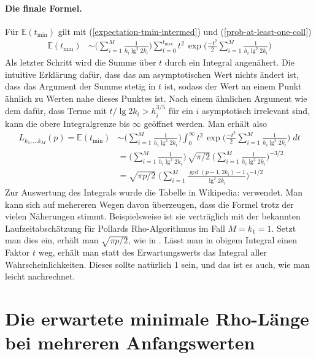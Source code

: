 \documentclass[a4paper, 10pt, ngerman]{article}
\newcommand{\E}{\mathbb{E}}
\begin{document}
\paragraph*{Die finale Formel.} \space \space Für $\E(t_{\min})$ gilt mit (\ref{expectation-tmin-intermed}) und (\ref{prob-at-least-one-coll})
\begin{align*}
    \E(t_{\min})
     & \sim \Bigg ( \sum_{i = 1}^M \frac 1 {h_i \lg^2 2k_i} \Bigg ) \sum_{t = 0}^{t_{\max}} t^2 \, \exp \Bigg ( \frac {-t^2} 2 \sum_{i = 1}^M \frac 1 {h_i \lg^2 2k_i} \Bigg )
\end{align*}
Als letzter Schritt wird die Summe über $t$ durch ein Integral angenähert. Die intuitive Erklärung dafür, dass das am asymptotischen Wert nichts ändert ist, dass das Argument der Summe stetig in $t$ ist, sodass der Wert an einem Punkt ähnlich zu Werten nahe dieses Punktes ist. Nach einem ähnlichen Argument wie dem dafür, dass Terme mit $t/\lg 2k_i > h_i^{3/5}$ für ein $i$ asymptotisch irrelevant sind, kann die obere Integralgrenze bis $\infty$ geöffnet werden. Man erhält also
\begin{align}
    L_{k_1, \dots k_M}(p) = \E(t_{\min})
     & \sim \Bigg ( \sum_{i = 1}^M \frac 1 {h_i \lg^2 2k_i} \Bigg ) \int_{0}^{\infty} t^2 \, \exp \Bigg ( \frac {-t^2} 2 \sum_{i = 1}^M \frac 1 {h_i \lg^2 2k_i} \Bigg ) \; dt \nonumber \\
     & = \Bigg (\sum_{i = 1}^M \frac 1 {h_i \lg^2 2k_i} \Bigg ) \, \sqrt {\pi / 2}  \ \Bigg ( \sum_{i = 1}^M \frac 1 {h_i \lg^2 2k_i} \Bigg )^{-3/2} \nonumber                           \\
     & = \sqrt{\pi p / 2} \; \Bigg ( \sum_{i = 1}^M \frac {\gcd(p - 1, 2k_i) - 1} {\lg^2 2k_i} \Bigg )^{-1/2}
    \label{expectation-tmin}
\end{align}
Zur Auswertung des Integrals wurde die Tabelle in Wikipedia: \cite{gint} verwendet. Man kann sich auf mehereren Wegen davon überzeugen, dass die Formel trotz der vielen Näherungen stimmt. Beispielsweise ist sie verträglich mit der bekannten Laufzeitabschätzung für Pollards Rho-Algorithmus im Fall $M = k_1 = 1$. Setzt man dies ein, erhält man $\sqrt{\pi p / 2}$, wie in \cite{pol75}. Lässt man in obigem Integral einen Faktor $t$ weg, erhält man statt des Erwartungswerts das Integral aller Wahrscheinlichkeiten. Dieses sollte natürlich 1 sein, und das ist es auch, wie man leicht nachrechnet.

\section{Die erwartete minimale Rho-Länge bei mehreren Anfangswerten}
\end{document}
